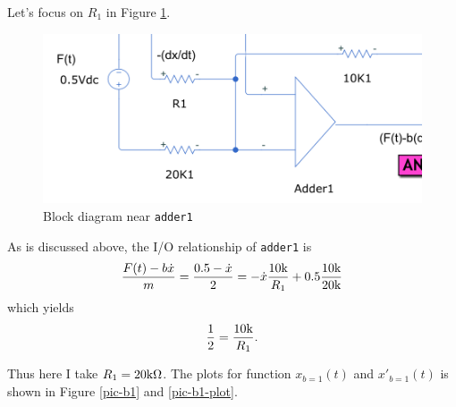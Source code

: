 Let's focus on $R_1$ in Figure \ref{pic-r1}.

\begin{figure}[h!]
  \centering
  \includegraphics[scale=0.5]{pics/adder1-r1.png}
  \caption{Block diagram near \texttt{adder1}}
  \label{pic-r1}
\end{figure}

As is discussed above, the I/O relationship of \texttt{adder1} is
\[ \frac{F(t)-b\dot{x}}{m}=\frac{0.5-\dot{x}}{2}=-\dot{x}\frac{10\text{k}}{R_1}
+0.5\frac{10\text{k}}{20\text{k}} \]
which yields
\[\frac{1}{2}=\frac{10\text{k}}{R_1}.\]

Thus here I take $R_1=20\text{k}\Omega$. The plots for function $x_{b=1}(t)$
and $x'_{b=1}(t)$ is shown in Figure \ref{pic-b1} and \ref{pic-b1-plot}.

